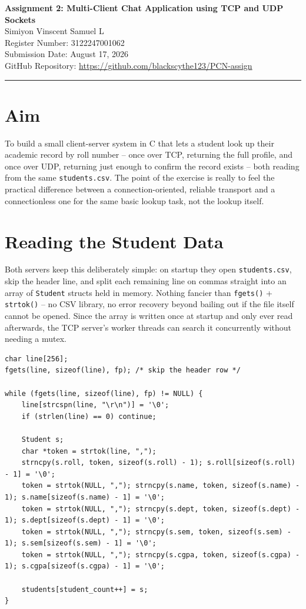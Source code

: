\documentclass[11pt,a4paper]{article}
\begin{document}
\begin{center}
{\LARGE \textbf{Assignment 2: Multi-Client Chat Application using TCP and UDP Sockets}}\\[4mm]
Simiyon Vinscent Samuel L\\
Register Number: 3122247001062\\
Submission Date: August 17, 2026\\
GitHub Repository: \url{https://github.com/blackscythe123/PCN-assign}
\end{center}

\vspace{2mm}
\hrule
\vspace{4mm}

\section*{Aim}
To build a small client-server system in C that lets a student look up their academic
record by roll number -- once over TCP, returning the full profile, and once over UDP,
returning just enough to confirm the record exists -- both reading from the same
\texttt{students.csv}. The point of the exercise is really to feel the practical
difference between a connection-oriented, reliable transport and a connectionless one for
the same basic lookup task, not the lookup itself.

\section*{Reading the Student Data}
Both servers keep this deliberately simple: on startup they open \texttt{students.csv},
skip the header line, and split each remaining line on commas straight into an array of
\texttt{Student} structs held in memory. Nothing fancier than \texttt{fgets()} +
\texttt{strtok()} -- no CSV library, no error recovery beyond bailing out if the file
itself cannot be opened. Since the array is written once at startup and only ever read
afterwards, the TCP server's worker threads can search it concurrently without needing a
mutex.

\begin{lstlisting}[caption={load\_students() -- shared parsing logic in both tcp\_server.c and udp\_server.c}]
char line[256];
fgets(line, sizeof(line), fp); /* skip the header row */

while (fgets(line, sizeof(line), fp) != NULL) {
    line[strcspn(line, "\r\n")] = '\0';
    if (strlen(line) == 0) continue;

    Student s;
    char *token = strtok(line, ",");
    strncpy(s.roll, token, sizeof(s.roll) - 1); s.roll[sizeof(s.roll) - 1] = '\0';
    token = strtok(NULL, ","); strncpy(s.name, token, sizeof(s.name) - 1); s.name[sizeof(s.name) - 1] = '\0';
    token = strtok(NULL, ","); strncpy(s.dept, token, sizeof(s.dept) - 1); s.dept[sizeof(s.dept) - 1] = '\0';
    token = strtok(NULL, ","); strncpy(s.sem, token, sizeof(s.sem) - 1); s.sem[sizeof(s.sem) - 1] = '\0';
    token = strtok(NULL, ","); strncpy(s.cgpa, token, sizeof(s.cgpa) - 1); s.cgpa[sizeof(s.cgpa) - 1] = '\0';

    students[student_count++] = s;
}
\end{lstlisting}
\end{document}
